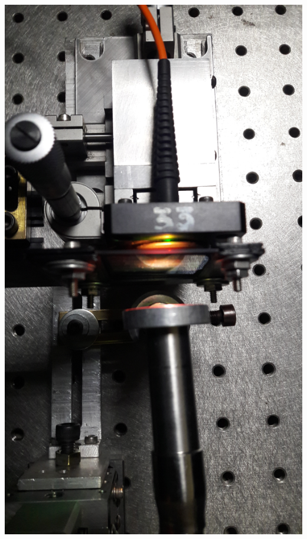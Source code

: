 \documentclass[12pt,dvipsnames]{exam}
\begin{document}
\begin{center}
	\includegraphics[scale=0.1]{imgs/setup_barrido/6.jpg}
\end{center}
\end{document}
